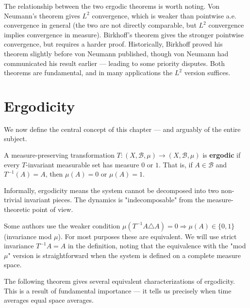 \begin{remark}
The relationship between the two ergodic theorems is worth noting. Von Neumann's theorem gives $L^2$ convergence, which is weaker than pointwise a.e. convergence in general (the two are not directly comparable, but $L^2$ convergence implies convergence in measure). Birkhoff's theorem gives the stronger pointwise convergence, but requires a harder proof. Historically, Birkhoff proved his theorem slightly before von Neumann published, though von Neumann had communicated his result earlier --- leading to some priority disputes. Both theorems are fundamental, and in many applications the $L^2$ version suffices.
\end{remark}


\section{Ergodicity}\label{sec:9.6}

We now define the central concept of this chapter --- and arguably of the entire subject.

\begin{definition}\label{def:9.10.}
A measure-preserving transformation $T: (X, \mathcal{B}, \mu) \to (X, \mathcal{B}, \mu)$ is \textbf{ergodic} if every $T$-invariant measurable set has measure $0$ or $1$. That is, if $A \in \mathcal{B}$ and $T^{-1}(A) = A$, then $\mu(A) = 0$ or $\mu(A) = 1$.

Informally, ergodicity means the system cannot be decomposed into two non-trivial invariant pieces. The dynamics is "indecomposable" from the measure-theoretic point of view.
\end{definition}


\begin{remark}
Some authors use the weaker condition $\mu(T^{-1}A \triangle A) = 0 \Rightarrow \mu(A) \in \{0, 1\}$ (invariance mod $\mu$). For most purposes these are equivalent. We will use strict invariance $T^{-1}A = A$ in the definition, noting that the equivalence with the "mod $\mu$" version is straightforward when the system is defined on a complete measure space.

The following theorem gives several equivalent characterizations of ergodicity. This is a result of fundamental importance --- it tells us precisely when time averages equal space averages.
\end{remark}


